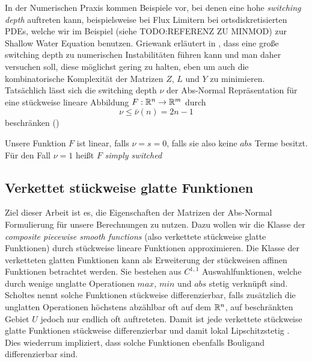 In der Numerischen Praxis kommen Beispiele vor, bei denen eine hohe \textit{switching depth} auftreten kann, beispielsweise bei Flux Limitern bei ortsdiskretisierten PDEs, welche wir im Beispiel (siehe TODO:REFERENZ ZU MINMOD) zur Shallow Water Equation benutzen. Griewank erläutert in \cite{monster}, dass eine große switching depth zu numerischen Instabilitäten führen kann und man daher versuchen soll, diese möglichst gering zu halten, eben um auch die kombinatorische Komplexität der Matrizen $Z$, $L$ und $Y$ zu minimieren. Tatsächlich lässt sich die switching depth $\nu$ der Abs-Normal Repräsentation für eine stückweise lineare Abbildung $F:\mathbb{R}^n\to\mathbb{R}^m$ durch 
\[
\nu \leq \bar \nu(n) = 2n-1                                                                                                                                                                                                                                                                                                                                                                                                                                                                                                                                                                                                                                                            \]
beschränken (\cite[S.3]{plan})


Unsere Funktion $F$ ist linear, falls $\nu=s = 0$, falls sie also keine $abs$ Terme besitzt. Für den Fall $\nu=1$ heißt $F$ \textit{simply switched}
\subsection{Verkettet stückweise glatte Funktionen}
Ziel dieser Arbeit ist es, die Eigenschaften der Matrizen der Abs-Normal Formulierung für unsere Berechnungen zu nutzen.
Dazu wollen wir die Klasse der \textit{composite piecewise smooth functions} (also verkettete stückweise glatte Funktionen) durch stückweise lineare Funktionen approximieren.
Die Klasse der verketteten glatten Funktionen kann als Erweiterung der stückweisen affinen Funktionen betrachtet werden. Sie bestehen aus $C^{1,1}$ Auswahlfunktionen, welche durch wenige unglatte Operationen $max$, $min$ und $abs$ stetig verknüpft sind.
Scholtes nennt solche Funktionen stückweise differenzierbar, falls  zusätzlich die unglatten Operationen höchstens abzählbar oft auf dem $\mathbb{R}^n$, auf beschränkten Gebiet $U$ jedoch nur endlich oft auftreteten. Damit ist jede verkettete stückweise glatte Funktionen stückweise differenzierbar und damit lokal Lipschitzstetig \cite[Cor. 4.1.1.]{scholtes2012introduction}. Dies wiederrum impliziert, dass solche Funktionen ebenfalls Bouligand differenzierbar sind.

